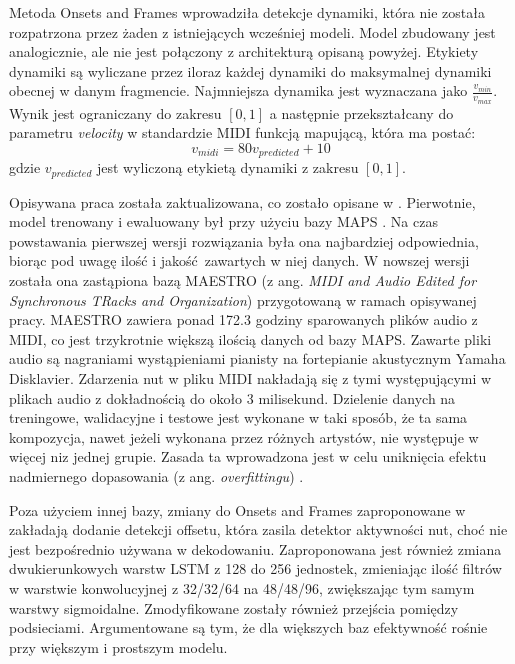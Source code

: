 \documentclass[12pt,a4paper,twoside]{mwart}
\begin{document}
Metoda Onsets and Frames wprowadziła detekcje dynamiki, która nie została rozpatrzona przez żaden z istniejących wcześniej modeli. Model zbudowany jest analogicznie, ale nie jest połączony z architekturą opisaną powyżej. Etykiety dynamiki są wyliczane przez iloraz każdej dynamiki do maksymalnej dynamiki obecnej w danym fragmencie. Najmniejsza dynamika jest wyznaczana jako $\frac{v_{min}}{v_{max}}$. Wynik jest ograniczany do zakresu $\left[0,1\right]$ a następnie przekształcany do parametru \textit{velocity} w standardzie MIDI funkcją mapującą, która ma postać:
\begin{equation}\label{eq:onsets:midiVelocity}
  v_{midi} = 80 v_{predicted} + 10
\end{equation}
gdzie $v_{predicted}$ jest wyliczoną etykietą dynamiki z zakresu $\left[0,1\right]$.

Opisywana praca została zaktualizowana, co zostało opisane w 
\cite[3-5]{Transcription:Cheng:OnsetsAndFramesNovelization}.
Pierwotnie, model trenowany i ewaluowany był przy użyciu bazy MAPS \cite{Transcription:OnsetsAndFrames:MAPS}. Na czas powstawania pierwszej wersji rozwiązania była ona najbardziej odpowiednia, biorąc pod uwagę ilość i jakość zawartych w niej danych. W nowszej wersji została ona zastąpiona bazą MAESTRO (z ang. \textit{MIDI and Audio Edited for Synchronous TRacks and Organization}) przygotowaną w ramach opisywanej pracy. MAESTRO zawiera ponad 172.3 godziny sparowanych plików audio z MIDI, co jest trzykrotnie większą ilością danych od bazy MAPS. Zawarte pliki audio są nagraniami wystąpieniami pianisty na fortepianie akustycznym Yamaha Disklavier. Zdarzenia nut w pliku MIDI nakładają się z tymi występującymi w plikach audio z dokładnością do około 3 milisekund. Dzielenie danych na treningowe, walidacyjne i testowe jest wykonane w taki sposób, że ta sama kompozycja, nawet jeżeli wykonana przez różnych artystów, nie występuje w więcej niz jednej grupie. Zasada ta wprowadzona jest w celu uniknięcia efektu nadmiernego dopasowania (z ang. \textit{overfittingu}) \cite{Transcription:Curtis:MAESTRO}.

Poza użyciem innej bazy, zmiany do Onsets and Frames zaproponowane w 
\cite[3-5]{Transcription:Cheng:OnsetsAndFramesNovelization} 
zakładają dodanie detekcji offsetu, która zasila detektor aktywności nut, choć nie jest bezpośrednio używana w dekodowaniu. Zaproponowana jest również zmiana dwukierunkowych warstw LSTM z 128 do 256 jednostek, zmieniając ilość filtrów w warstwie konwolucyjnej z 32/32/64 na 48/48/96, zwiększając tym samym warstwy sigmoidalne. Zmodyfikowane zostały również przejścia pomiędzy podsieciami. Argumentowane są tym, że dla większych baz efektywność rośnie przy większym i prostszym modelu. 
\end{document}
